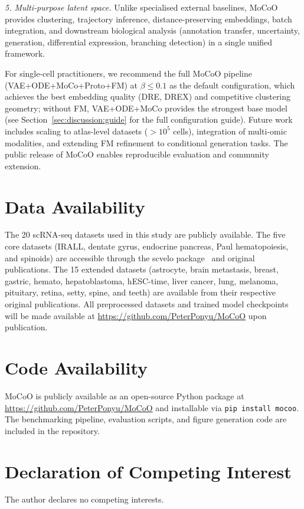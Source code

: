 \documentclass[journal]{IEEEtran}
\begin{document}
\textit{5. Multi-purpose latent space.} Unlike specialised external baselines, MoCoO provides clustering, trajectory inference, distance-preserving embeddings, batch integration, and downstream biological analysis (annotation transfer, uncertainty, generation, differential expression, branching detection) in a single unified framework.

For single-cell practitioners, we recommend the full MoCoO pipeline (VAE+ODE+MoCo+Proto+FM) at $\beta{\leq}0.1$ as the default configuration, which achieves the best embedding quality (DRE, DREX) and competitive clustering geometry; without FM, VAE+ODE+MoCo provides the strongest base model (see Section~\ref{sec:discussion:guide} for the full configuration guide). Future work includes scaling to atlas-level datasets ($>10^5$ cells), integration of multi-omic modalities, and extending FM refinement to conditional generation tasks. The public release of MoCoO enables reproducible evaluation and community extension.

\section*{Data Availability}
The 20 scRNA-seq datasets used in this study are publicly available. The five core datasets (IRALL, dentate gyrus, endocrine pancreas, Paul hematopoiesis, and spinoids) are accessible through the scvelo package~\cite{bergen2020generalizing} and original publications. The 15 extended datasets (astrocyte, brain metastasis, breast, gastric, hemato, hepatoblastoma, hESC-time, liver cancer, lung, melanoma, pituitary, retina, setty, spine, and teeth) are available from their respective original publications. All preprocessed datasets and trained model checkpoints will be made available at \url{https://github.com/PeterPonyu/MoCoO} upon publication.

\section*{Code Availability}
MoCoO is publicly available as an open-source Python package at \url{https://github.com/PeterPonyu/MoCoO} and installable via \texttt{pip install mocoo}. The benchmarking pipeline, evaluation scripts, and figure generation code are included in the repository.

\section*{Declaration of Competing Interest}
The author declares no competing interests.
\end{document}
